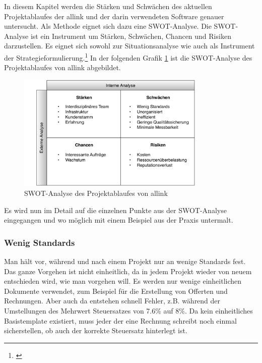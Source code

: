In diesem Kapitel werden die Stärken und Schwächen des aktuellen Projektablaufes
der allink und der darin verwendeten Software genauer untersucht. Als Methode
eignet sich dazu eine SWOT-Analyse. Die SWOT-Analyse ist ein Instrument um
Stärken, Schwächen, Chancen und Risiken darzustellen. Es eignet sich sowohl zur Situationsanalyse
wie auch als Instrument der Strategieformulierung.\footnote{\citealp*[Vgl.][S. 134]{homburg2000quantitative}}
In der folgenden Grafik \ref{pic:swot_analyse} ist die SWOT-Analyse des Projektablaufes
von allink abgebildet.

\begin{figure}[htbp]
\begin{center}
\includegraphics[width=0.8\textwidth,angle=0]{./bilder/analyse/swot_analyse.pdf}
\caption{SWOT-Analyse des Projektablaufes von allink}
\label{pic:swot_analyse}
\end{center}
\end{figure}

Es wird nun im Detail auf die einzelnen Punkte aus der SWOT-Analyse eingegangen
und wo möglich mit einem Beispiel aus der Praxis untermalt.

% 

\subsubsection{Wenig Standards}
Man hält vor, während und nach einem Projekt nur an wenige Standards fest. 
Das ganze Vorgehen ist nicht einheitlich, da in jedem Projekt wieder von
neuem entschieden wird, wie man vorgehen will. Es werden nur wenige einheitlichen
Dokumente verwendet, zum Beispiel für die Erstellung von Offerten und Rechnungen.
Aber auch da entstehen schnell Fehler, z.B. während der Umstellungen des 
Mehrwert Steuersatzes von 7.6\% auf 8\%. Da kein einheitliches Basistemplate
existiert, muss jeder der eine Rechnung schreibt noch einmal sicherstellen, ob
auch der korrekte Steuersatz hinterlegt ist. 

